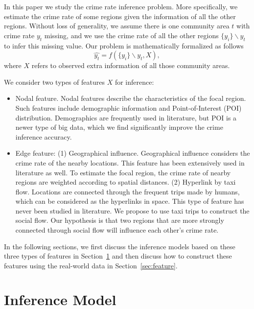 In this paper we study the crime rate inference problem. More specifically, we estimate the crime rate of some regions given the information of all the other regions. Without loss of generality, we assume there is one community area $t$ with crime rate $y_t$ missing, and we use the crime rate of all the other regions $\{y_i \} \backslash y_t$ to infer this missing value. Our problem is mathematically formalized as follows
\begin{equation}
\hat{y_t} = f( \{y_i\} \backslash y_t, X),
\end{equation}
where  $X$ refers to observed extra information of  all those community areas.




\smallskip
We consider two  types of features $X$ for inference: \vspace{-1mm}
\begin{itemize}[leftmargin=*]
\item Nodal feature. Nodal features describe the characteristics of the focal region. Such features include demographic information and Point-of-Interest (POI) distribution. Demographics are frequently used in literature, but POI is a newer type of big data, which we find significantly improve the crime inference accuracy.
\item Edge feature: (1) Geographical influence. Geographical influence considers the crime rate of the nearby locations.  This feature has been extensively used in
literature as well. To estimate the focal region, the
crime rate of nearby regions are weighted according
to spatial distances. (2) Hyperlink by taxi flow. Locations are connected through the frequent trips made by humans, which can be considered as the hyperlinks in space. This type of feature has never been studied in literature. We propose to use taxi trips to construct the social flow. Our hypothesis is that two regions that are more strongly connected through social flow will influence each other's crime rate.
\end{itemize}

In the following sections, we first discuss the inference models based on these three types of features in Section~\ref{sec:model} and then discuss how to construct these features using the real-world data in Section~\ref{sec:feature}.








\section{Inference Model}
\label{sec:model}


